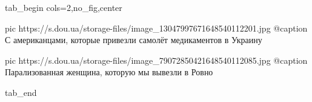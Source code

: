  
 
 
 
 


\ifcmt
  tab_begin cols=2,no_fig,center

     pic https://s.dou.ua/storage-files/image_13047997671648540112201.jpg
     @caption С американцами, которые привезли самолёт медикаментов в Украину

     pic https://s.dou.ua/storage-files/image_79072850421648540112085.jpg
     @caption Парализованная женщина, которую мы вывезли в Ровно

  tab_end
\fi
